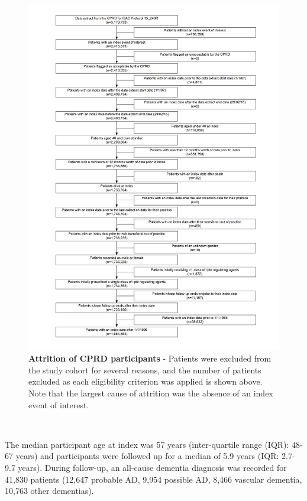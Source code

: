 \documentclass[a4paper, twoside]{templates/ociamthesis}
\begin{document}
\begin{figure}[H]
\includegraphics[width=1\linewidth]{figures/cprd-analysis/cohort_attrition} \caption[Attrition of CPRD participants]{\textbf{Attrition of CPRD participants} - Patients were excluded from the study cohort for several reasons, and the number of patients excluded as each eligibility criterion was applied is shown above. Note that the largest cause of attrition was the absence of an index event of interest.}\label{fig:cprdFlowchart}
\end{figure}

~

The median participant age at index was 57 years (inter-quartile range (IQR): 48-67 years) and participants were followed up for a median of 5.9 years (IQR: 2.7-9.7 years). During follow-up, an all-cause dementia diagnosis was recorded for 41,830 patients (12,647 probable AD, 9,954 possible AD, 8,466 vascular dementia, 10,763 other dementias).
\end{document}
